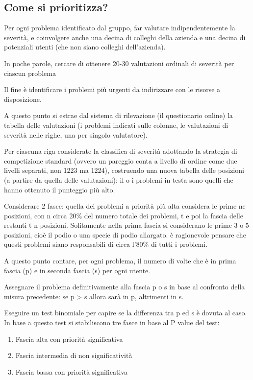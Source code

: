 \documentclass[11pt,a4paper]{book}
\begin{document}
\subsection{Come si prioritizza?}
Per ogni problema identificato dal gruppo, far valutare indipendentemente la severità, e coinvolgere anche una decina di colleghi della azienda e una decina di potenziali utenti (che non siano colleghi dell'azienda).

In poche parole, cercare di ottenere 20-30 valutazioni ordinali di severità per ciascun problema

Il fine è identificare i problemi più urgenti da indirizzare con le risorse a disposizione.

A questo punto si estrae dal sistema di rilevazione (il questionario online) la tabella delle valutazioni (i problemi indicati sulle colonne, le valutazioni di severità nelle righe, una per singolo valutatore).

Per ciascuna riga considerate la classifica di severità adottando la strategia di competizione standard (ovvero un pareggio conta a livello di ordine come due livelli separati, non 1223 ma 1224), costruendo una nuova tabella delle posizioni (a partire da quella delle valutazioni): il o i problemi in testa sono quelli che hanno ottenuto il punteggio più alto.

Considerare 2 fasce: quella dei problemi a priorità più alta considera le prime ne posizioni, con n circa 20\% del numero totale dei problemi, t e poi la fascia delle restanti t-n posizioni. Solitamente nella prima fascia si considerano le prime 3 o 5 posizioni, cioè il podio o una specie di podio allargato. è ragionevole pensare che questi problemi siano responsabili di circa l'80\% di tutti i problemi.

A questo punto contare, per ogni problema, il numero di volte che è in prima fascia (p) e in seconda fascia (s) per ogni utente.

Assegnare il problema definitivamente alla fascia p o s in base al confronto della misura precedente: se p > s allora sarà in p, altrimenti in s.

Eseguire un test binomiale per capire se la differenza tra p ed s è dovuta al caso. In base a questo test si stabiliscono tre fasce in base al P value del test:
\begin{enumerate}
	\item Fascia alta con priorità significativa
	\item Fascia intermedia di non significatività
	\item Fascia bassa con priorità significativa
\end{enumerate}
\end{document}
